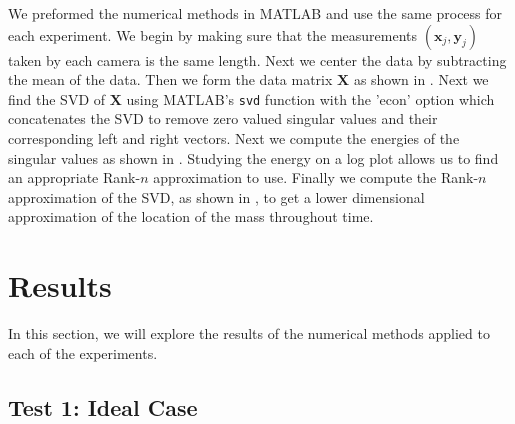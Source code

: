 \documentclass[12pt]{article}%
\begin{document}
We preformed the numerical methods in MATLAB and use the same process for each experiment. We begin by making sure that the measurements $(\mathbf{x}_j, \mathbf{y}_j)$ taken by each camera is the same length. Next we center the data by subtracting the mean of the data. Then we form the data matrix $\mathbf{X}$ as shown in . Next we find the SVD of $\mathbf{X}$ using MATLAB's \verb+svd+ function with the 'econ' option which concatenates the SVD to remove zero valued singular values and their corresponding left and right vectors. Next we compute the energies of the singular values as shown in . Studying the energy on a log plot allows us to find an appropriate Rank-$n$ approximation to use. Finally we compute the Rank-$n$ approximation of the SVD, as shown in , to get a lower dimensional approximation of the location of the mass throughout time.  


\section{Results}

In this section, we will explore the results of the numerical methods applied to each of the experiments.

\subsection{Test 1: Ideal Case}
\end{document}
